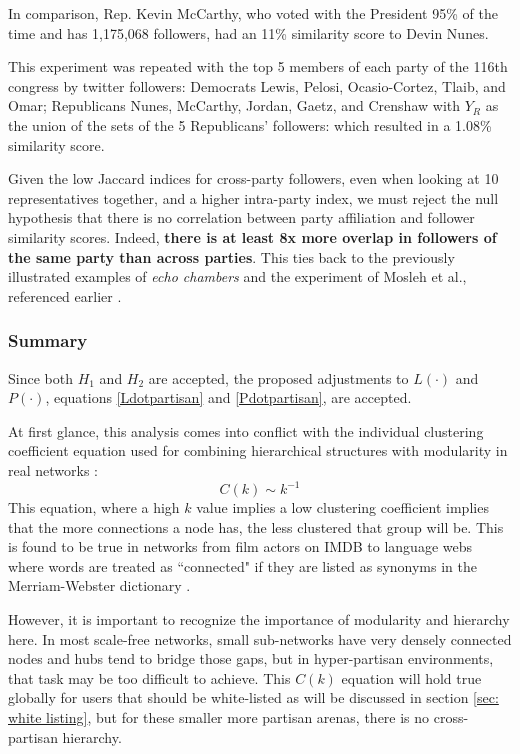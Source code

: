 \documentclass[preprint,review,12pt]{elsarticle}
\begin{document}
In comparison, Rep. Kevin McCarthy, who voted with the President 95\% of the time and has 1,175,068 followers, had an 11\% similarity score to Devin Nunes.

This experiment was repeated with the top 5 members of each party of the 116th congress by twitter followers: Democrats Lewis, Pelosi, Ocasio-Cortez, Tlaib, and Omar; Republicans Nunes, McCarthy, Jordan, Gaetz, and Crenshaw with $Y_R$ as the union of the sets of the 5 Republicans' followers: which resulted in a 1.08\% similarity score.

Given the low Jaccard indices for cross-party followers, even when looking at 10 representatives together, and a higher intra-party index, we must reject the null hypothesis that there is no correlation between party affiliation and follower similarity scores. Indeed, \textbf{there is at least 8x more overlap in followers of the same party than across parties}. This ties back to the previously illustrated examples of \textit{echo chambers} and the experiment of Mosleh et al., referenced earlier \cite{mosleh2020shared}.

\subsubsection{Summary}
\label{sec: P dot summary}
Since both $H_1$ and $H_2$ are accepted, the proposed adjustments to $L(\cdot)$ and $P(\cdot)$, equations \ref{Ldotpartisan} and \ref{Pdotpartisan}, are accepted.

At first glance, this analysis comes into conflict with the individual clustering coefficient equation used for combining hierarchical structures with modularity in real networks \cite{ravasz2003hierarchical,dorogovtsev2008critical,dorogovtsev2002pseudofractal}:
\begin{equation}
\label{hierarchy equation}
    C(k) \sim k^{-1}
\end{equation}
This equation, where a high $k$ value implies a low clustering coefficient implies that the more connections a node has, the less clustered that group will be. This is found to be true in networks from film actors on IMDB \cite{amaral2000classes,albert2000topology,barabasi1999emergence} to language webs where words are treated as ``connected" if they are listed as synonyms in the Merriam-Webster dictionary \cite{sole2001small,yook2002modeling,sigman2002global,dorogovtsev2001language}. 

However, it is important to recognize the importance of modularity and hierarchy here. In most scale-free networks, small sub-networks have very densely connected nodes and hubs tend to bridge those gaps, but in hyper-partisan environments, that task may be too difficult to achieve. This $C(k)$ equation will hold true globally for users that should be white-listed as will be discussed in section \ref{sec: white listing}, but for these smaller more partisan arenas, there is no cross-partisan hierarchy. 
\end{document}
